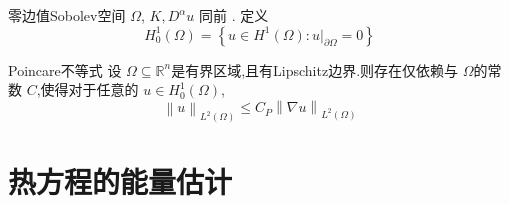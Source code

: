 \documentclass[../../main.tex]{subfiles}
\begin{document}
\begin{definition}{零边值Sobolev空间}
    \(   \Omega   \), \(  K,D^{\alpha }u  \) 同前   . 定义 \[
    H_{0}^{1}\left(  \Omega  \right)= \left\{ u\in H^{1}\left(  \Omega  \right): \left. u \right|_{ \partial  \Omega }  = 0\right\} 
    \]
\end{definition}

\begin{lemma}{Poincare不等式}
    设 \(   \Omega \subseteq \mathbb{R} ^{n}  \)是有界区域,且有Lipschitz边界.则存在仅依赖与 \(   \Omega   \)的常数 \(  C  \),使得对于任意的 \(  u \in H_{0}^{1}\left(  \Omega  \right)   \), \[
    \left\| u \right\|_{L^{2}\left(  \Omega  \right) }\le C _{P}\left\|  \nabla u \right\|_{L^{2}\left(  \Omega  \right) }
    \]    
\end{lemma}

\section{热方程的能量估计}
\end{document}
